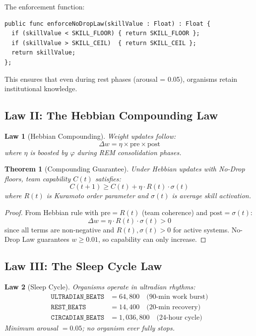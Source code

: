 \documentclass[12pt]{article}
\newtheorem{theorem}{Theorem}
\newtheorem{law}{Law}
\newcommand{\PHI}{\varphi}
\begin{document}
The enforcement function:
\begin{verbatim}
public func enforceNoDropLaw(skillValue : Float) : Float {
  if (skillValue < SKILL_FLOOR) { return SKILL_FLOOR };
  if (skillValue > SKILL_CEIL)  { return SKILL_CEIL };
  return skillValue;
};
\end{verbatim}

This ensures that even during rest phases (arousal = 0.05), organisms retain institutional knowledge.

\subsection{Law II: The Hebbian Compounding Law}

\begin{law}[Hebbian Compounding]
Weight updates follow:
\begin{equation}
  \Delta w = \eta \times \text{pre} \times \text{post}
\end{equation}
where $\eta$ is boosted by $\PHI$ during REM consolidation phases.
\end{law}

\begin{theorem}[Compounding Guarantee]
Under Hebbian updates with No-Drop floors, team capability $C(t)$ satisfies:
\begin{equation}
  C(t+1) \geq C(t) + \eta \cdot R(t) \cdot \sigma(t)
\end{equation}
where $R(t)$ is Kuramoto order parameter and $\sigma(t)$ is average skill activation.
\end{theorem}

\begin{proof}
From Hebbian rule with $\text{pre} = R(t)$ (team coherence) and $\text{post} = \sigma(t)$:
\[
\Delta w = \eta \cdot R(t) \cdot \sigma(t) > 0
\]
since all terms are non-negative and $R(t), \sigma(t) > 0$ for active systems.
No-Drop Law guarantees $w \geq 0.01$, so capability can only increase.
\end{proof}

\subsection{Law III: The Sleep Cycle Law}

\begin{law}[Sleep Cycle]
Organisms operate in ultradian rhythms:
\begin{align}
  \texttt{ULTRADIAN\_BEATS} &= 64{,}800 \quad \text{(90-min work burst)} \\
  \texttt{REST\_BEATS} &= 14{,}400 \quad \text{(20-min recovery)} \\
  \texttt{CIRCADIAN\_BEATS} &= 1{,}036{,}800 \quad \text{(24-hour cycle)}
\end{align}
Minimum arousal $= 0.05$; no organism ever fully stops.
\end{law}
\end{document}
